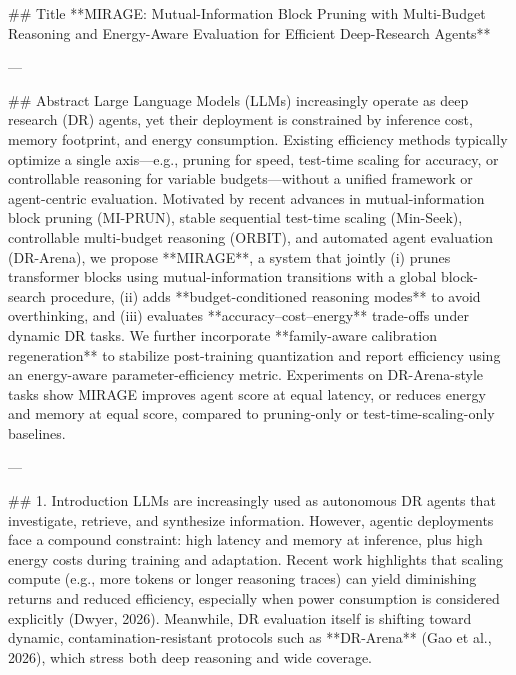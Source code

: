 ## Title  
**MIRAGE: Mutual-Information Block Pruning with Multi-Budget Reasoning and Energy-Aware Evaluation for Efficient Deep-Research Agents**

---

## Abstract  
Large Language Models (LLMs) increasingly operate as deep research (DR) agents, yet their deployment is constrained by inference cost, memory footprint, and energy consumption. Existing efficiency methods typically optimize a single axis—e.g., pruning for speed, test-time scaling for accuracy, or controllable reasoning for variable budgets—without a unified framework or agent-centric evaluation. Motivated by recent advances in mutual-information block pruning (MI-PRUN), stable sequential test-time scaling (Min-Seek), controllable multi-budget reasoning (ORBIT), and automated agent evaluation (DR-Arena), we propose **MIRAGE**, a system that jointly (i) prunes transformer blocks using mutual-information transitions with a global block-search procedure, (ii) adds **budget-conditioned reasoning modes** to avoid overthinking, and (iii) evaluates **accuracy–cost–energy** trade-offs under dynamic DR tasks. We further incorporate **family-aware calibration regeneration** to stabilize post-training quantization and report efficiency using an energy-aware parameter-efficiency metric. Experiments on DR-Arena-style tasks show MIRAGE improves agent score at equal latency, or reduces energy and memory at equal score, compared to pruning-only or test-time-scaling-only baselines.  

---

## 1. Introduction  
LLMs are increasingly used as autonomous DR agents that investigate, retrieve, and synthesize information. However, agentic deployments face a compound constraint: high latency and memory at inference, plus high energy costs during training and adaptation. Recent work highlights that scaling compute (e.g., more tokens or longer reasoning traces) can yield diminishing returns and reduced efficiency, especially when power consumption is considered explicitly (Dwyer, 2026). Meanwhile, DR evaluation itself is shifting toward dynamic, contamination-resistant protocols such as **DR-Arena** (Gao et al., 2026), which stress both deep reasoning and wide coverage.

